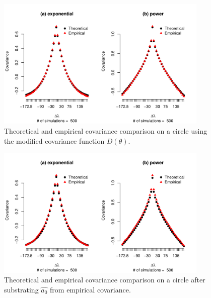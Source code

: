 	      \begin{figure}[H]
	      	\centering
	      	\includegraphics[width=0.9\textwidth]{graphs/covarince_circle_remove_a0}
	      	\caption[Theoretical and empirical covariance comparison on a circle using the]{Theoretical and empirical covariance comparison on a circle using the modified covariance function $D(\theta)$.}
	      \end{figure}


	\begin{figure}[H]
	 \centering
	 \includegraphics[width=0.9\textwidth]{graphs/covarince_circle_estimate_a0}
	 \caption[Theoretical and empirical covariance comparison on a circle after]{Theoretical and empirical covariance comparison on a circle after substrating $\hat{a_0}$ from empirical covariance.}
	 \end{figure}


